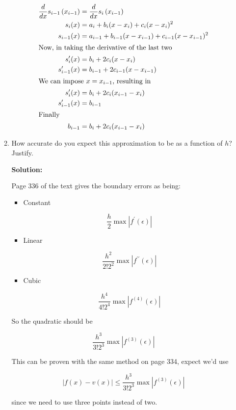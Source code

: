 \documentclass[12pt]{article}
\newcommand{\abs}[1]{\left| #1 \right|}
\renewcommand{\P}[1]{\left( #1 \right)}
\begin{document}
\begin{enumerate}
\begin{enumerate}
  \begin{align*}
    \frac{d}{dx}s_{i-1}\P{x_{i-1}} &= \frac{d}{dx}s_{i}\P{x_{i-1}}\\
    s_{i}(x) &= a_{i} + b_{i}(x - x_{i}) + c_{i}(x - x_{i})^{2}\\
    s_{i-1}(x) &= a_{i-1} + b_{i-1}(x - x_{i-1}) + c_{i-1}(x - x_{i-1})^{2}\\
    \intertext{Now, in taking the derivative of the last two}
    s_{i}^{\prime}(x) &= b_{i} + 2c_{i}(x - x_{i})\\
    s_{i-1}^{\prime}(x) &= b_{i-1} + 2c_{i-1}(x - x_{i-1})\\
    \intertext{We can impose $x = x_{i-1}$, resulting in}
    s_{i}^{\prime}(x) &= b_{i} + 2c_{i}(x_{i-1} - x_{i})\\
    s_{i-1}^{\prime}(x) &= b_{i-1}\\
    \intertext{Finally}
    b_{i-1} &= b_{i} + 2c_{i}(x_{i-1} - x_{i})
  \end{align*}

  \item How accurate do you expect this approximation to be as a function of $h$? Justify.

  {\bf Solution:}

  Page 336 of the text gives the boundary errors as being:
  \begin{itemize}
    \item {\sc Constant}

      \[
          \frac{h}{2}\max{\abs{f^{\prime}(\epsilon)}}
      \]

    \item {\sc Linear}

    \[
        \frac{h^{2}}{2!2^{2}}\max{\abs{f^{\prime\prime}(\epsilon)}}
    \]

    \item {\sc Cubic}

    \[
        \frac{h^4}{4!2^4}\max{\abs{f^{(4)}(\epsilon)}}
    \]
  \end{itemize}

  So the quadratic should be

  \[
      \frac{h^3}{3!2^3}\max{\abs{f^{(3)}(\epsilon)}}
  \]

  This can be proven with the same method on page 334, expect we'd use

  \[
      \abs{f(x) - v(x)} \leq \frac{h^{3}}{3!2^3}\max{\abs{f^{(3)}(\epsilon)}}
  \]

  since we need to use three points instead of two.


\end{enumerate}
\end{enumerate}
\end{document}
